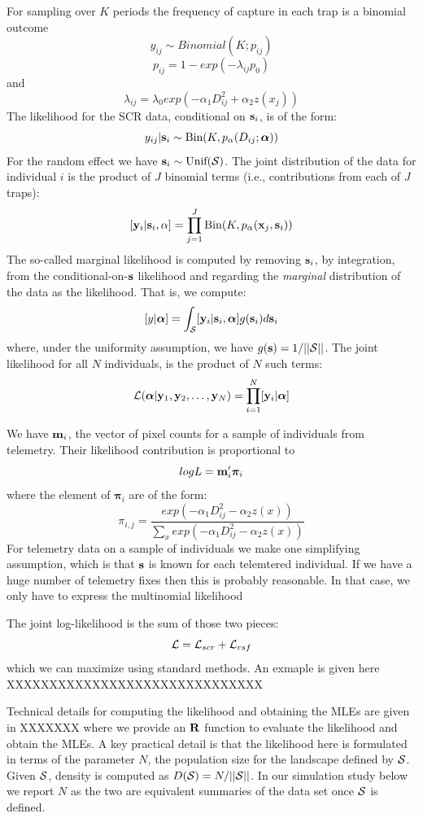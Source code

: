 For sampling over $K$ periods the frequency of capture in each trap is
a binomial outcome
\[
 y_{ij} \sim Binomial(K; p_{ij})
\]
\[
 p_{ij} = 1-exp(- \lambda_{ij} p_{0} ) 
\]
and
\[
 \lambda_{ij} = \lambda_{0} exp(- \alpha_{1} D_{ij}^{2} + \alpha_{2}  z(x_{j}) )
\]
The likelihood for the SCR data, conditional on ${\bf s}_{i}$, is of
the form:
\begin{equation}
y_{ij}| {\bf s}_{i} \sim \mbox{Bin}(K, p_{\alpha}(D_{ij}; {\bm \alpha}))
\label{rsf.mle.eq.cond-on-s}
\end{equation}
For the random effect we have ${\bf s}_{i} \sim  \mbox{Unif}({\cal
  S})$.
The joint distribution of the data for individual $i$ is the product
of $J$ binomial terms (i.e., contributions from each of $J$ traps):
\[
  [{\bf y}_{i} | {\bf s}_{i} , \alpha] =
  \prod_{j=1}^{J} \mbox{Bin}(K, p_{\alpha}({\bf x}_{j},{\bf s}_{i}) )
\]
 The so-called marginal likelihood is computed by removing
${\bf s}_{i}$, by integration,  from the conditional-on-${\bf s}$
likelihood and regarding the {\it marginal} distribution of the data
as the likelihood. That
is, we compute:
\[
  [y|{\bm \alpha}] =
\int_{{\cal S}}  [ {\bf y}_{i} |{\bf s}_{i},{\bm \alpha}] g({\bf s}_{i}) d{\bf s}_{i}
\]
{\flushleft where}, under the uniformity assumption, we have
$g({\bf s}) = 1/||{\cal S}||$.
The joint likelihood for all $N$ individuals, 
is the product of $N$ such terms:
\[
{\cal L}({\bm \alpha} | {\bf y}_{1},{\bf y}_{2},\ldots, {\bf y}_{N}) = \prod_{i=1}^{N}
[{\bf y}_{i}|{\bm \alpha}]
\]

We have ${\bf m}_{i}$, the vector of pixel counts for a sample of
individuals from telemetry. Their likelihood contribution is
proportional to
\[
 logL = {\bf m}_{i}'{\bm \pi}_{i}
\]
where the element of ${\bm \pi}_{i}$ are of the form:
\[
 \pi_{i,j} = \frac{ exp( -\alpha_{1} D_{ij}^{2} -\alpha_{2} z(x) ) }
{ \sum_{x} exp(-\alpha_{1} D_{ij}^{2} -\alpha_{2} z(x))} 
\]
For telemetry data on a sample of individuals we  make one
simplifying assumption, which is that ${\bf s}$ is known for each
telemtered individual.  If we have a huge number of telemetry fixes
then this is probably reasonable.  In that case, we only have to
express the multinomial likelihood

The joint log-likelihood is the sum of those two pieces:
\[
{\cal L} = {\cal L}_{scr} + {\cal L}_{rsf}
\]
which we can maximize using standard methods. An exmaple is given here XXXXXXXXXXXXXXXXXXXXXXXXXXXXXX


Technical details for computing the likelihood and obtaining the MLEs
are given in XXXXXXX where we provide an ${\bf R}$ function to
evaluate the likelihood and obtain the MLEs.  A key practical detail
is that the likelihood here is formulated in terms of the parameter
$N$, the population size for the landscape defined by ${\cal
  S}$. Given ${\cal S}$, density is computed as $D({\cal S}) =
N/||{\cal S}||$. In our simulation study below we report $N$ as the
two are equivalent summaries of the data set once ${\cal S}$ is
defined.



